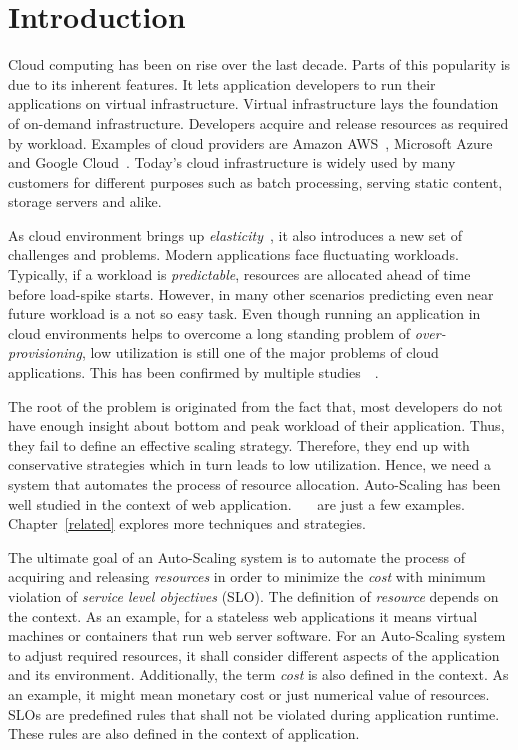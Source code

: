 \chapter{Introduction}
\label{prob-def}
Cloud computing has been on rise over the last decade. Parts of this popularity is due to its inherent features. It lets application developers to run their applications on virtual infrastructure. Virtual infrastructure lays the foundation of on-demand infrastructure. Developers acquire and release resources as required by workload. Examples of cloud providers are Amazon AWS~\cite{aws}, Microsoft Azure~\cite{azure} and Google Cloud~\cite{gc}. Today's cloud infrastructure is widely used by many customers for different purposes such as batch processing, serving static content, storage servers and alike.

As cloud environment brings up \emph{elasticity}~\cite{Roman:2013}, it also introduces a new set of challenges and problems. Modern applications face fluctuating workloads. Typically, if a workload is \emph{predictable}, resources are allocated ahead of time before load-spike starts. However, in many other scenarios predicting even near future workload is a not so easy task. Even though running an application in cloud environments helps to overcome a long standing problem of \emph{over-provisioning}, low utilization is still one of the major problems of cloud applications. This has been confirmed by multiple studies~\cite{Delimitrou:2014}~\cite{Reiss:2012}.

The root of the problem is originated from the fact that, most developers do not have enough insight about bottom and peak workload of their application. Thus, they fail to define an effective scaling strategy. Therefore, they end up with conservative strategies which in turn leads to low utilization. Hence, we need a system that automates the process of resource allocation. Auto-Scaling has been well studied in the context of web application.~\cite{Hasan2012IntegratedAA}~\cite{Dutreilh2010}~\cite{Herbst:2013} are just a few examples. Chapter~\ref{related} explores more techniques and strategies.

The ultimate goal of an Auto-Scaling system is to automate the process of acquiring and releasing \emph{resources} in order to minimize the \emph{cost} with minimum violation of \emph{service level objectives} (SLO). The definition of \emph{resource} depends on the context. As an example, for a stateless web applications it means virtual machines or containers that run web server software. For an Auto-Scaling system to adjust required resources, it shall consider different aspects of the application and its environment. Additionally, the term \emph{cost} is also defined in the context. As an example, it might mean monetary cost or just numerical value of resources. SLOs are predefined rules that shall not be violated during application runtime. These rules are also defined in the context of application.

